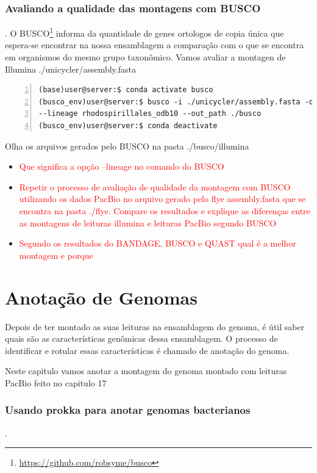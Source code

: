 \documentclass[letter,11pt]{book}
\begin{document}
\subsection{Avaliando a qualidade das montagens com BUSCO}.
O BUSCO\footnote{\url{https://github.com/robsyme/busco}} informa da quantidade de genes ortologos de copia única que espera-se encontrar na nossa ensamblagem a comparação com o que se encontra em organismos do mesmo grupo taxonômico.
Vamos avaliar a montagen de Illumina ./unicycler/assembly.fasta

\begin{Verbatim}[commandchars=!\{\}, numbers=left,label= BUSCO para dados Illumina,frame=topline,fontsize=\scriptsize]
(base)user@server:$ conda activate busco
(busco_env)user@server:$ busco -i ./unicycler/assembly.fasta -o illumina -m geno \
--lineage rhodospirillales_odb10 --out_path ./busco
(busco_env)user@server:$ conda deactivate
\end{Verbatim}

Olha os arquivos gerados pelo BUSCO na pasta ./busco/illumina

\begin{itemize}
\item \textcolor{red}{Que significa a opção --lineage no comando do BUSCO}
\item \textcolor{red}{Repetir o processo de avaliação de qualidade da montagem com BUSCO utilizando os dados PacBio no arquivo gerado pelo flye assembly.fasta que se encontra na pasta ./flye. Compare os resultados e explique as diferenças entre as montagens de leituras illumina e leituras PacBio segundo BUSCO}
\item \textcolor{red}{Segundo os resultados do BANDAGE, BUSCO e QUAST qual é a melhor montagem e porque}
\end{itemize}

\chapter{Anotação de Genomas}

Depois de ter montado as suas leituras na ensamblagem do genoma, é útil saber quais são as características genômicas dessa ensamblagem. O processo de identificar e rotular essas características é chamado de anotação do genoma.

Neste capitulo vamos anotar a montagem do genoma montado com leituras PacBio feito no capitulo 17

\subsection{Usando prokka para anotar genomas bacterianos}.
\end{document}
